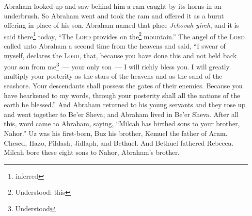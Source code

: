\begin{enumerate}[align=center]
     Abraham looked up and saw behind him a ram caught by its horns in an underbrush. So Abraham went and took the ram and offered it as a burnt offering in place of his son.%
     Abraham named that place \textit{Jehovah-yireh}, and it is said there\footnote{inferred} today, ``The \textsc{Lord} provides on the\footnote{Understood: this} mountain.''%
     The angel of the \textsc{Lord} called unto Abraham a second time from the heavens%
     and said, ``I swear of myself, declares the \textsc{Lord}, that, because you have done this and not held back your son from me\footnote{Understood}~--- your only son~---%
     I will richly bless you. I will greatly multiply your posterity as the stars of the heavens and as the sand of the seashore. Your descendants shall possess the gates of their enemies.%
     Because you have hearkened to my words, through your posterity shall all the nations of the earth be blessed.''%
     And Abraham returned to his young servants and they rose up and went together to Be'er Sheva; and Abraham lived in Be'er Sheva.%
     After all this, word came to Abraham, saying, ``Milcah has birthed sons to your brother, Nahor.''%
     Uz was his first-born, Buz his brother, Kemuel the father of Aram.%
     Chesed, Hazo, Pildash, Jidlaph, and Bethuel.%
     And Bethuel fathered Rebecca. Milcah bore these eight sons to Nahor, Abraham's brother.%
\end{enumerate}
